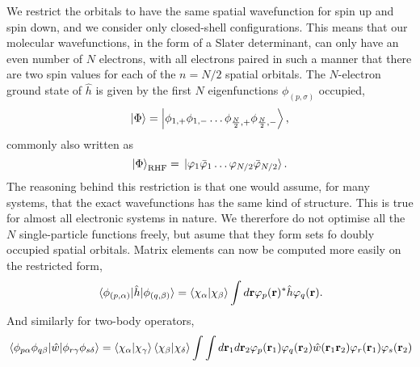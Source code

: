 We restrict the orbitals to have the same spatial wavefunction for spin up and spin
down, and we consider only closed-shell configurations. This means that our 
molecular wavefunctions, in the form of a Slater determinant, can only have an 
even number of $N$ electrons, with all electrons paired in such a manner that there 
are two spin values for each of the $n=N/2$ spatial orbitals. The $N$-electron 
ground state of $\hat{h}$ is given by the first $N$ eigenfunctions $\phi_{(p,\sigma)}$
occupied,
\begin{equation}
    \ket{\Phi} = \ket{\phi_{1,+}\phi_{1,-}\dots \phi_{\frac{N}{2},+}\phi_{\frac{N}{2},-}},
\end{equation}
commonly also written as 
\begin{equation}
    \ket{\Phi}_{\text{RHF}} = 
    \ket*{\varphi_1 \bar{\varphi}_1 \dots \varphi_{N/2} \bar{\varphi}_{N/2}}.
\end{equation}
The reasoning behind this restriction is that one would assume, for many systems, that 
the exact wavefunctions has the same kind of structure. This is true for almost all 
electronic systems in nature. We thererfore do not optimise all the $N$ single-particle 
functions freely, but asume that they form sets fo doubly occupied spatial orbitals. 
Matrix elements can now be computed more easily on the restricted form,
\begin{equation}
    \mel*{\phi_{(p,\alpha)}}{\hat{h}}{\phi_{(q,\beta)}} 
    = \braket{\chi_\alpha}{\chi_\beta}
        \int d\vb{r} \varphi_p(\vb{r})^*\hat{h}\varphi_q(\vb{r}).
\end{equation}
And similarly for two-body operators,
\begin{equation}
    \mel{\phi_{p\alpha}\phi_{q\beta}}{\hat{w}}{\phi_{r\gamma}\phi_{s\delta}}
    = \braket{\chi_\alpha}{\chi_\gamma}\braket{\chi_\beta}{\chi_\delta}
        \int \int d \vb{r}_1 d \vb{r}_2 \varphi_p(\vb{r}_1)\varphi_q(\vb{r}_2)
            \hat{w}(\vb{r}_1 \vb{r}_2) \varphi_r(\vb{r}_1)\varphi_s(\vb{r}_2)
\end{equation}

